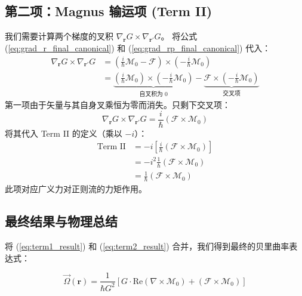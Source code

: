 \documentclass[a4paper,12pt]{article}
\begin{document}
\subsection{第二项：Magnus 输运项 (Term II)}

我们需要计算两个梯度的叉积 $\nabla_{\mathbf{r}} G \times \nabla_{\mathbf{r}'} G$。
将公式 (\ref{eq:grad_r_final_canonical}) 和 (\ref{eq:grad_rp_final_canonical}) 代入：
\begin{align}
    \nabla_{\mathbf{r}} G \times \nabla_{\mathbf{r}'} G &= \left( \frac{i}{\hbar} \boldsymbol{\mathcal{M}}_0 - \boldsymbol{\mathcal{F}} \right) \times \left( -\frac{i}{\hbar} \boldsymbol{\mathcal{M}}_0 \right) \nonumber \\
    &= \underbrace{\left( \frac{i}{\hbar} \boldsymbol{\mathcal{M}}_0 \right) \times \left( -\frac{i}{\hbar} \boldsymbol{\mathcal{M}}_0 \right)}_{\text{自叉积为 0}} - \underbrace{\boldsymbol{\mathcal{F}} \times \left( -\frac{i}{\hbar} \boldsymbol{\mathcal{M}}_0 \right)}_{\text{交叉项}}
\end{align}
第一项由于矢量与其自身叉乘恒为零而消失。只剩下交叉项：
\begin{equation}
    \nabla_{\mathbf{r}} G \times \nabla_{\mathbf{r}'} G = \frac{i}{\hbar} (\boldsymbol{\mathcal{F}} \times \boldsymbol{\mathcal{M}}_0)
\end{equation}
将其代入 Term II 的定义（乘以 $-i$）：
\begin{align}
    \text{Term II} &= -i \left[ \frac{i}{\hbar} (\boldsymbol{\mathcal{F}} \times \boldsymbol{\mathcal{M}}_0) \right] \nonumber \\
    &= -i^2 \frac{1}{\hbar} (\boldsymbol{\mathcal{F}} \times \boldsymbol{\mathcal{M}}_0) \nonumber \\
    &= \frac{1}{\hbar} (\boldsymbol{\mathcal{F}} \times \boldsymbol{\mathcal{M}}_0)
    \label{eq:term2_result}
\end{align}
此项对应广义力对正则流的力矩作用。

\subsection{最终结果与物理总结}

将 (\ref{eq:term1_result}) 和 (\ref{eq:term2_result}) 合并，我们得到最终的贝里曲率表达式：

\begin{mdframed}[linewidth=1.2pt, linecolor=black, backgroundcolor=gray!5]
\begin{equation}
    \vec{\Omega}(\mathbf{r}) = \frac{1}{\hbar G^2} \left[ G \cdot \text{Re}(\nabla \times \boldsymbol{\mathcal{M}}_0) + (\boldsymbol{\mathcal{F}} \times \boldsymbol{\mathcal{M}}_0) \right]
    \label{eq:berryomega}
\end{equation}
\end{mdframed}
\end{document}
